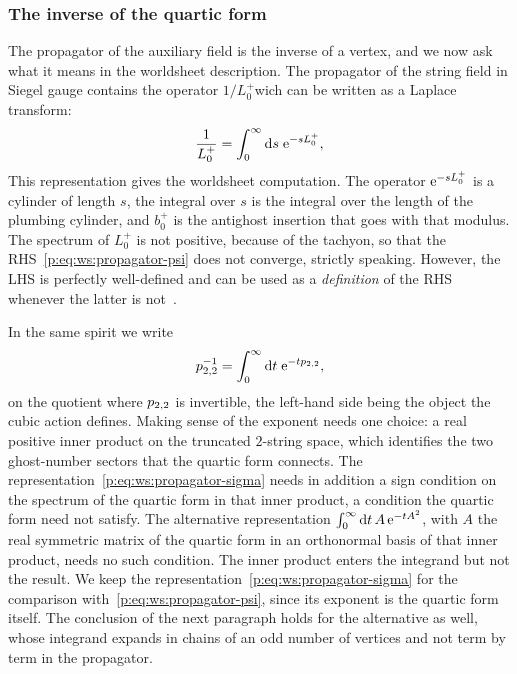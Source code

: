 \subsubsection{The inverse of the quartic form}
\label{p:sec:ws:inverse}


The propagator of the auxiliary field is the inverse of a vertex, and we now ask what it means in the worldsheet description.
The propagator of the string field in Siegel gauge contains the operator $1 / L_0^+$wich can be written as a Laplace transform:
\begin{equation}
  \label{p:eq:ws:propagator-psi}
  \frac{1}{L_0^+}
    = \int_0^\infty \mathrm{d} s \; \mathrm{e}^{- s L_0^+},
\end{equation}
This representation gives the worldsheet computation.
The operator $\mathrm{e}^{- s L_0^+}$ is a cylinder of length $s$, the integral over $s$ is the integral over the length of the plumbing cylinder, and $b_0^+$ is the antighost insertion that goes with that modulus.
The spectrum of $L_0^+$ is not positive, because of the tachyon, so that the RHS~\eqref{p:eq:ws:propagator-psi} does not converge, strictly speaking.
However, the LHS is perfectly well-defined and can be used as a \emph{definition} of the RHS whenever the latter is not~\cite{Sen:2015:OffshellAmplitudesSuperstring,deLacroix:2017:ClosedSuperstringField,Erbin:2021:StringFieldTheory}.

In the same spirit we write
\begin{equation}
  \label{p:eq:ws:propagator-sigma}
  p_{2,2}^{-1}
    = \int_0^\infty \mathrm{d} t \; \mathrm{e}^{- t p_{2,2}},
\end{equation}
on the quotient where $p_{2,2}$ is invertible, the left-hand side being the object the cubic action defines.
Making sense of the exponent needs one choice: a real positive inner product on the truncated $2$-string space, which identifies the two ghost-number sectors that the quartic form connects.
The representation~\eqref{p:eq:ws:propagator-sigma} needs in addition a sign condition on the spectrum of the quartic form in that inner product, a condition the quartic form need not satisfy.
The alternative representation $\int_0^\infty \mathrm{d} t \, A \, \mathrm{e}^{- t A^2}$, with $A$ the real symmetric matrix of the quartic form in an orthonormal basis of that inner product, needs no such condition.
The inner product enters the integrand but not the result.
We keep the representation~\eqref{p:eq:ws:propagator-sigma} for the comparison with~\eqref{p:eq:ws:propagator-psi}, since its exponent is the quartic form itself.
  The conclusion of the next paragraph holds for the alternative as well, whose integrand expands in chains of an odd number of vertices and not term by term in the propagator.

